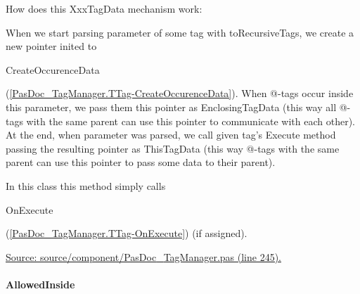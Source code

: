 \documentclass{report}
\begin{document}
\begin{list}{}
How does this XxxTagData mechanism work:

When we start parsing parameter of some tag with toRecursiveTags, we create a new pointer inited to \begin{ttfamily}CreateOccurenceData\end{ttfamily}(\ref{PasDoc_TagManager.TTag-CreateOccurenceData}). When @{-}tags occur inside this parameter, we pass them this pointer as EnclosingTagData (this way all @{-}tags with the same parent can use this pointer to communicate with each other). At the end, when parameter was parsed, we call given tag's Execute method passing the resulting pointer as ThisTagData (this way @{-}tags with the same parent can use this pointer to pass some data to their parent).

In this class this method simply calls \begin{ttfamily}OnExecute\end{ttfamily}(\ref{PasDoc_TagManager.TTag-OnExecute}) (if assigned).\par
\href{https://github.com/pasdoc/pasdoc/blob/master/source/component/PasDoc_TagManager.pas#L245}{Source: source/component/PasDoc{\_}TagManager.pas (line 245).}

\end{list}
\paragraph*{AllowedInside}\hspace*{\fill}
\end{document}
